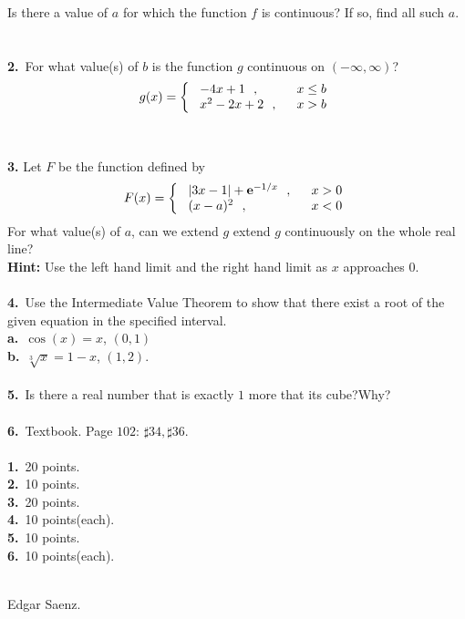 \documentclass[12pt]{article}
\def\e{\mathbf{e}}
\begin{document}
Is there a value of $a$ for which the function $f$ is continuous? If
so, find all such $a$.\\
\\
\\
\textbf{2.}\ For what value(s) of $b$ is the function $g$ continuous
on $(-\infty,\infty)$?
$$g(x)=\left\{ \begin{array}{ll}
              \  -4x+1  \  \  , & \  \  \hbox{$x\leq b$}
              \\
               \ x^2-2x+2 \  \ , & \  \  \hbox{$x>b$}
            \end{array}
            \right. $$
\\
\\
\textbf{3.}  Let $F$ be the function defined by 
$$F(x)=\left\{ \begin{array}{ll}
              \  |3x-1|+\e^{-1/x}  \  \  , & \  \  \hbox{$x> 0$}
              \\
               \  (x-a)^2\  \ , & \  \  \hbox{$x<0$}
            \end{array}
            \right. $$
For what value(s) of $a$, can we extend $g$ extend $g$ continuously on the whole real line?\\
\textbf{Hint:} Use the left hand limit and the right hand limit as $x$ approaches 0.
\\
\\
\textbf{4.}\ Use the Intermediate Value Theorem to show that there
exist a root of the given equation in the specified interval.\\
\textbf{a.}\ $\cos(x)=x$, $(0,1)$ \.
\\
\textbf{b.}\ $\sqrt[3]{x}=1-x$, $(1,2)$.\
\\
\\
\textbf{5.}\ Is there a real number that is exactly $1$ more that
its cube?Why?
\\
\\
\textbf{6.}\ Textbook. Page $102$: $\sharp34,\sharp36$.
\\
\\
\textbf{1.}\ 20 points.\\
\textbf{2.}\ 10 points.\\
\textbf{3.}\ 20 points.\\
\textbf{4.}\ 10 points(each).\\
\textbf{5.}\ 10 points.\\
\textbf{6.}\ 10 points(each).\\
\\
\begin{flushright}
Edgar Saenz.
\end{flushright}
\end{document}

